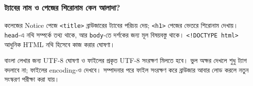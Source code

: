 \subsubsection{ট্যাবের নাম ও পেজের শিরোনাম কেন আলাদা?}
কলেজের Notice পেজে \texttt{<title>} ব্রাউজারের ট্যাবের পরিচয় দেয়; \texttt{<h1>} পেজের ভেতরে শিরোনাম দেখায়। \texttt{head}-এ নথি সম্পর্কে তথ্য থাকে, আর \texttt{body}-তে দর্শকের জন্য মূল বিষয়বস্তু থাকে। \texttt{<!DOCTYPE html>} আধুনিক HTML নথি হিসেবে কাজ করার ঘোষণা।

বাংলা লেখার জন্য UTF-8 ঘোষণা ও ফাইলের প্রকৃত UTF-8 সংরক্ষণ মিলতে হবে। ভুল অক্ষর দেখলে শুধু ট্যাগ বদলাবে না; ফাইলের encoding-ও দেখবে। সম্পাদনার পরে ফাইল সংরক্ষণ করে ব্রাউজার আবার লোড করলে নতুন সংস্করণ পরীক্ষা করা যায়।
